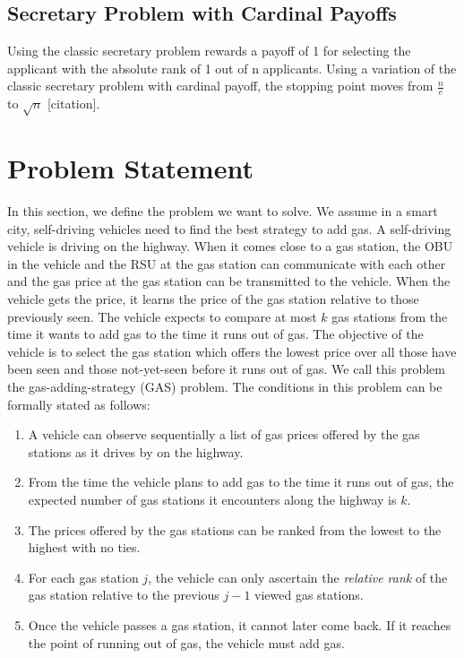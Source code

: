 \documentclass[conference]{IEEEtran}
\theoremstyle{definition}
\begin{document}
\subsection{Secretary Problem with Cardinal Payoffs}
Using the classic secretary problem rewards a payoff of 1 for selecting the applicant with the absolute rank of 1 out of n applicants. Using a variation of the classic secretary problem with cardinal payoff, the stopping point moves from $\frac{n}{e}$ to $\sqrt{n}$ [citation].

\section{Problem Statement} \label{problem}
In this section, we define the problem we want to solve. We assume in a smart city, self-driving vehicles need to find the best strategy to add gas. A self-driving vehicle is driving on the highway. When it comes close to a gas station, the OBU in the vehicle and the RSU at the gas station can communicate with each other and the gas price at the gas station can be transmitted to the vehicle. When the vehicle gets the price, it learns the price of the gas station relative to those previously seen. The vehicle expects to compare at most $k$ gas stations from the time it wants to add gas to the time it runs out of gas. The objective of the vehicle is to select the gas station which offers the lowest price over all those have been seen and those not-yet-seen before it runs out of gas. We call this problem the gas-adding-strategy (GAS) problem. The conditions in this problem can be formally stated as follows:

\begin{enumerate}
\item A vehicle can observe sequentially a list of gas prices offered by the gas stations as it drives by on the highway.
\item From the time the vehicle plans to add gas to the time it runs out of gas, the expected number of gas stations it encounters along the highway is $k$.
\item The prices offered by the gas stations can be ranked from the lowest to the highest with no ties.
\item For each gas station $j$, the vehicle can only ascertain the {\em relative rank} of the gas station relative to the previous $j-1$ viewed gas stations.
\item Once the vehicle passes a gas station, it cannot later come back. If it reaches the point of running out of gas, the vehicle must add gas.
\end{enumerate}
\end{document}
